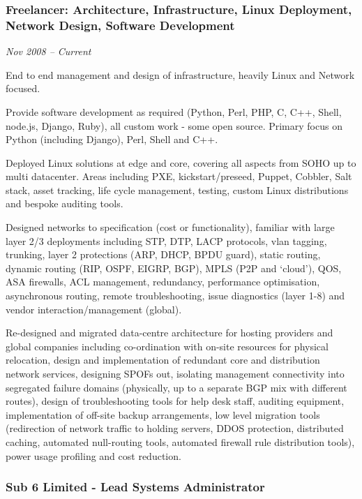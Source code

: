 \subsubsection{Freelancer: Architecture, Infrastructure, Linux
Deployment, Network Design, Software Development}

\emph{Nov 2008 -- Current}

End to end management and design of infrastructure, heavily Linux and
Network focused.

Provide software development as required (Python, Perl, PHP, C, C++,
Shell, node.js, Django, Ruby), all custom work - some open source.
Primary focus on Python (including Django), Perl, Shell and C++.

Deployed Linux solutions at edge and core, covering all aspects from
SOHO up to multi datacenter. Areas including PXE, kickstart/preseed,
Puppet, Cobbler, Salt stack, asset tracking, life cycle management,
testing, custom Linux distributions and bespoke auditing tools.

Designed networks to specification (cost or functionality), familiar
with large layer 2/3 deployments including STP, DTP, LACP protocols,
vlan tagging, trunking, layer 2 protections (ARP, DHCP, BPDU guard),
static routing, dynamic routing (RIP, OSPF, EIGRP, BGP), MPLS (P2P and
`cloud'), QOS, ASA firewalls, ACL management, redundancy, performance
optimisation, asynchronous routing, remote troubleshooting, issue
diagnostics (layer 1-8) and vendor interaction/management (global).

Re-designed and migrated data-centre architecture for hosting providers
and global companies including co-ordination with on-site resources for
physical relocation, design and implementation of redundant core and
distribution network services, designing SPOFs out, isolating management
connectivity into segregated failure domains (physically, up to a
separate BGP mix with different routes), design of troubleshooting tools
for help desk staff, auditing equipment, implementation of off-site
backup arrangements, low level migration tools (redirection of network
traffic to holding servers, DDOS protection, distributed caching,
automated null-routing tools, automated firewall rule distribution
tools), power usage profiling and cost reduction.

\subsubsection{Sub 6 Limited - Lead Systems Administrator}

